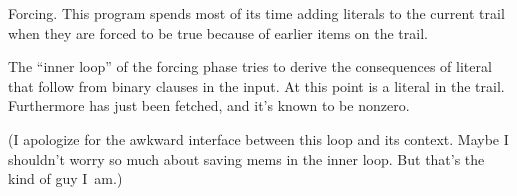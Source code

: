 Forcing. This program spends most of its time adding
literals
to the current trail when they are forced to be true because of
earlier items on the trail.

The ``inner loop'' of the forcing phase tries to derive the
consequences of literal~ that follow from binary clauses in the
input. At this point  is a literal in the trail.
Furthermore 
has just been fetched, and it's known to be nonzero.

(I apologize for the awkward interface between this loop and its context.
Maybe I shouldn't worry so much about saving mems in the inner loop.
But that's the kind of guy I~am.)

